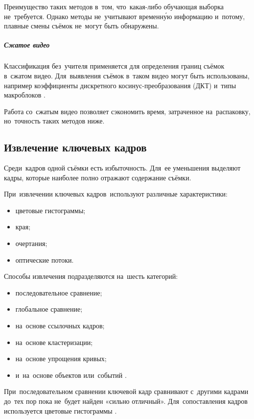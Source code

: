 Преимущество таких методов в~том, что~какая-либо
обучающая выборка не~требуется.
Однако методы не~учитывают временну́ю информацию
и~потому, плавные смены съёмок не~могут быть обнаружены.


\subparagraph{Сжатое видео}

Классификация без~учителя применяется для
определения границ съёмок в~сжатом видео.
Для~выявления съёмок в~таком видео могут быть использованы,
например коэффициенты дискретного косинус-преобразования
(ДКТ) и~типы макроблоков
\cite{Zhao:2006} \cite{Bruyne:2008} \cite{Koumaras:2006}.

Работа со~сжатым видео позволяет сэкономить
время, затраченное на~распаковку,
но~точность таких методов ниже.


\subsection{Извлечение ключевых кадров}

Среди~кадров одной съёмки есть избыточность.
Для~ее уменьшения выделяют кадры,
которые наиболее полно отражают содержание съёмки.

При~извлечении ключевых кадров\
используют различные характеристики:
\begin{itemize}
    \item цветовые гистограммы;
    \item края;
    \item очертания;
    \item оптические потоки.
\end{itemize}

Способы извлечения подразделяются на~шесть категорий:
\begin{itemize}
    \item последовательное сравнение;
    \item глобальное сравнение;
    \item на~основе ссылочных кадров;
    \item на~основе кластеризации;
    \item на~основе упрощения кривых;
    \item и~на~основе объектов или~событий \cite{Truong:2007}.
\end{itemize}

При~последовательном сравнении ключевой кадр сравнивают
с~другими кадрами до~тех пор пока не~будет найден «сильно отличный».
Для~сопоставления кадров используется цветовые гистограммы \cite{Zhang:2003}.

